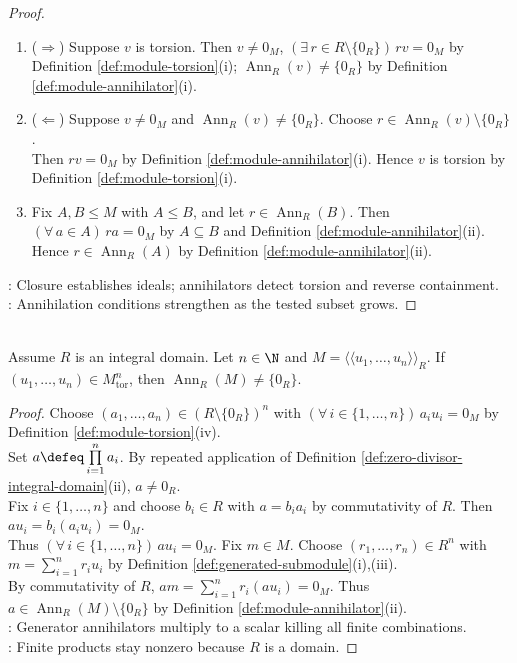 \begin{proposition}
\begin{proof}
\begin{enumerate}[label=(\roman*)]
\item[$(ii)$] ($\Rightarrow$) Suppose $v$ is torsion. Then $v\neq0_M$, $(\exists\,r\in R\setminus\{0_R\})\,rv=0_M$ by Definition \ref{def:module-torsion}(i); $\operatorname{Ann}_R(v)\neq\{0_R\}$ by Definition \ref{def:module-annihilator}(i).
\item[$(ii)$] ($\Leftarrow$) Suppose $v\neq0_M$ and $\operatorname{Ann}_R(v)\neq\{0_R\}$. Choose $r\in\operatorname{Ann}_R(v)\setminus\{0_R\}$.\\
Then $rv=0_M$ by Definition \ref{def:module-annihilator}(i). Hence $v$ is torsion by Definition \ref{def:module-torsion}(i).
\item[$(iii)$] Fix $A,B\leq M$ with $A\leq B$, and let $r\in\operatorname{Ann}_R(B)$. Then $(\forall\,a\in A)\,ra=0_M$ by $A\subseteq B$ and Definition \ref{def:module-annihilator}(ii).\\
Hence $r\in\operatorname{Ann}_R(A)$ by Definition \ref{def:module-annihilator}(ii).
\end{enumerate}
: Closure establishes ideals; annihilators detect torsion and reverse containment.\\
: Annihilation conditions strengthen as the tested subset grows.
\end{proof}
\end{proposition}

\begin{proposition} \label{prop:finitely-generated-torsion-module-annihilator} \\
Assume $R$ is an integral domain. Let $n\in\N$ and $M=\langle\!\langle u_1,\ldots,u_n\rangle\!\rangle_R$. If $(u_1,\ldots,u_n)\in M_{\operatorname{tor}}^n$, then $\operatorname{Ann}_R(M)\neq\{0_R\}$.
\begin{proof}
Choose $(a_1,\ldots,a_n)\in(R\setminus\{0_R\})^n$ with $(\forall\,i\in\{1,\ldots,n\})\,a_iu_i=0_M$ by Definition \ref{def:module-torsion}(iv).\\
Set $a\defeq\prod\limits_{i=1}^{n}a_i$. By repeated application of Definition \ref{def:zero-divisor-integral-domain}(ii), $a\neq0_R$.\\
Fix $i\in\{1,\ldots,n\}$ and choose $b_i\in R$ with $a=b_ia_i$ by commutativity of $R$. Then $au_i=b_i(a_iu_i)=0_M$.\\
Thus $(\forall\,i\in\{1,\ldots,n\})\,au_i=0_M$. Fix $m\in M$. Choose $(r_1,\ldots,r_n)\in R^n$ with $m=\sum\limits_{i=1}^{n}r_iu_i$ by Definition \ref{def:generated-submodule}(i),(iii).\\
By commutativity of $R$, $am=\sum\limits_{i=1}^{n}r_i(au_i)=0_M$. Thus $a\in\operatorname{Ann}_R(M)\setminus\{0_R\}$ by Definition \ref{def:module-annihilator}(ii).\\
: Generator annihilators multiply to a scalar killing all finite combinations.\\
: Finite products stay nonzero because $R$ is a domain.
\end{proof}
\end{proposition}
